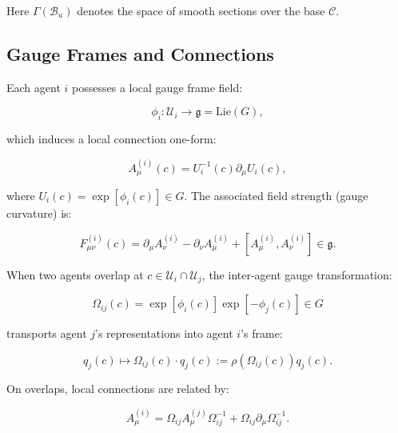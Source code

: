 \documentclass[twoside,11pt]{article}
\begin{document}
Here $\Gamma(\mathcal{B}_u)$ denotes the space of smooth sections over the base $\mathcal{C}$.

\subsection{Gauge Frames and Connections}
Each agent $i$ possesses a local gauge frame field:

\begin{equation}
\phi_i: \mathcal{U}_i \to \mathfrak{g} = \text{Lie}(G),
\end{equation}

which induces a local connection one-form:

\begin{equation}
A^{(i)}_\mu(c) = U_i^{-1}(c) \partial_\mu U_i(c),
\end{equation}

where $U_i(c) = \exp[\phi_i(c)] \in G$. The associated field strength (gauge curvature) is:

\begin{equation}
F^{(i)}_{\mu\nu}(c) = \partial_\mu A^{(i)}_\nu - \partial_\nu A^{(i)}_\mu + [A^{(i)}_\mu, A^{(i)}_\nu] \in \mathfrak{g}.
\end{equation}

When two agents overlap at $c \in \mathcal{U}_i \cap \mathcal{U}_j$, the inter-agent gauge transformation:

\begin{equation}
\Omega_{ij}(c) = \exp[\phi_i(c)] \exp[-\phi_j(c)] \in G
\end{equation}

transports agent $j$'s representations into agent $i$'s frame:

\begin{equation}
q_j(c) \mapsto \Omega_{ij}(c) \cdot q_j(c) := \rho(\Omega_{ij}(c)) q_j(c).
\end{equation}

On overlaps, local connections are related by:

\begin{equation}
A^{(i)}_\mu = \Omega_{ij} A^{(j)}_\mu \Omega_{ij}^{-1} + \Omega_{ij} \partial_\mu \Omega_{ij}^{-1}.
\end{equation}
\end{document}
